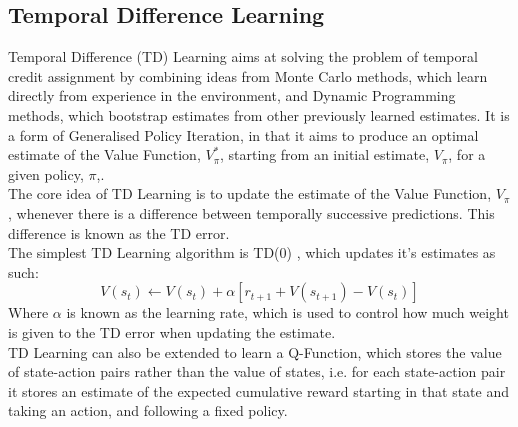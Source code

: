 \subsection{Temporal Difference Learning}
Temporal Difference (TD) Learning \cite{10.5555/911176, 5392560, 5391906} aims at solving the problem of temporal credit assignment by combining ideas from Monte Carlo methods, which learn directly from experience in the environment, and Dynamic Programming methods, which bootstrap estimates from other previously learned estimates. It is a form of Generalised Policy Iteration, in that it aims to produce an optimal estimate of the Value Function, $V_\pi^*$, starting from an initial estimate, $V_\pi$, for a given policy, $\pi$,\cite{Sutton1998}.
\\The core idea of TD Learning is to update the estimate of the Value Function, $V_\pi$, whenever there is a difference between temporally successive predictions. This difference is known as the TD error.
\\The simplest TD Learning algorithm is TD(0) \cite{Sutton:1988}, which updates it's estimates as such:
$$V(s_t) \leftarrow V(s_t) + \alpha[r_{t+1} + V(s_{t+1}) - V(s_t)]$$
Where $\alpha$ is known as the learning rate, which is used to control how much weight is given to the TD error when updating the estimate.
\\TD Learning can also be extended to learn a Q-Function, which stores the value of state-action pairs rather than the value of states, i.e. for each state-action pair it stores an estimate of the expected cumulative reward starting in that state and taking an action, and following a fixed policy.


